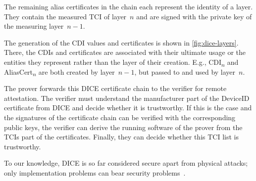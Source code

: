 
The remaining alias certificates in the chain each represent the identity of a layer.
They contain the measured \ac{TCI} of layer~\( n \) and are signed with the private key of the measuring layer~\( n-1 \).


The generation of the \ac{CDI} values and certificates is shown in \autoref{fig:dice-layers}.
There, the \acp{CDI} and certificates are associated with their ultimate usage or the entities they represent rather than the layer of their creation.
E.g., CDI\textsubscript{\(n\)} and AliasCert\textsubscript{\(n\)} are both created by layer~\( n-1 \), but passed to and used by layer~\( n \).


The prover forwards this DICE certificate chain to the verifier for remote attestation.
The verifier must understand the manufacturer part of the DeviceID certificate from DICE and decide whether it is trustworthy.
If this is the case and the signatures of the certificate chain can be verified with the corresponding public keys, the verifier can derive the running software of the prover from the \acp{TCI} part of the certificates.
Finally, they can decide whether this \ac{TCI} list is trustworthy.


To our knowledge, \ac{DICE} is so far considered secure apart from physical attacks; only implementation problems can bear security problems~\cite{Jaeger2020, Hristozov2022}.

